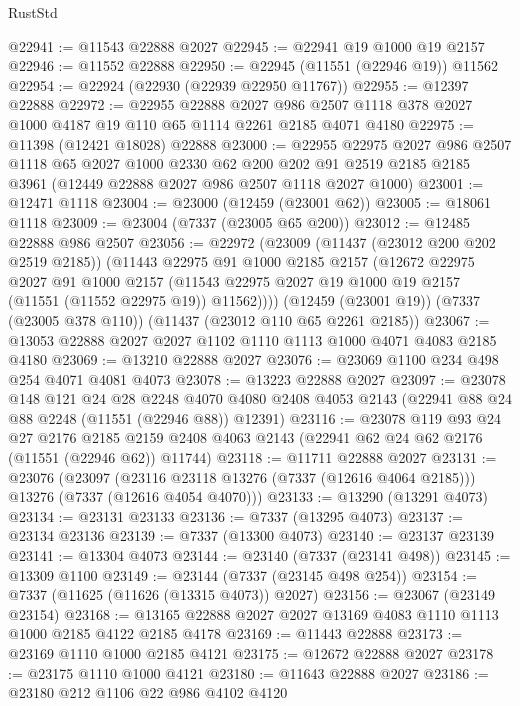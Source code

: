 \begin{lexlean}{RustStd}
\begin{coremodule}
@22941 := @11543 @22888 @2027
@22945 := @22941 @19 @1000 @19 @2157
@22946 := @11552 @22888
@22950 := @22945 (@11551 (@22946 @19)) @11562
@22954 := @22924 (@22930 (@22939 @22950 @11767))
@22955 := @12397 @22888
@22972 := @22955
    @22888
    @2027
    @986
    @2507
    @1118
    @378
    @2027
    @1000
    @4187
    @19
    @110
    @65
    @1114
    @2261
    @2185
    @4071
    @4180
@22975 := @11398 (@12421 @18028) @22888
@23000 := @22955
    @22975
    @2027
    @986
    @2507
    @1118
    @65
    @2027
    @1000
    @2330
    @62
    @200
    @202
    @91
    @2519
    @2185
    @2185
    @3961
    (@12449 @22888 @2027 @986 @2507 @1118 @2027 @1000)
@23001 := @12471 @1118
@23004 := @23000 (@12459 (@23001 @62))
@23005 := @18061 @1118
@23009 := @23004 (@7337 (@23005 @65 @200))
@23012 := @12485 @22888 @986 @2507
@23056 := @22972
    (@23009
      (@11437 (@23012 @200 @202 @2519 @2185))
      (@11443
        @22975
        @91
        @1000
        @2185
        @2157
        (@12672
          @22975
          @2027
          @91
          @1000
          @2157
          (@11543 @22975 @2027 @19 @1000 @19 @2157 (@11551 (@11552 @22975 @19)) @11562))))
    (@12459 (@23001 @19))
    (@7337 (@23005 @378 @110))
    (@11437 (@23012 @110 @65 @2261 @2185))
@23067 := @13053 @22888 @2027 @2027 @1102 @1110 @1113 @1000 @4071 @4083 @2185 @4180
@23069 := @13210 @22888 @2027
@23076 := @23069 @1100 @234 @498 @254 @4071 @4081 @4073
@23078 := @13223 @22888 @2027
@23097 := @23078
    @148
    @121
    @24
    @28
    @2248
    @4070
    @4080
    @2408
    @4053
    @2143
    (@22941 @88 @24 @88 @2248 (@11551 (@22946 @88)) @12391)
@23116 := @23078
    @119
    @93
    @24
    @27
    @2176
    @2185
    @2159
    @2408
    @4063
    @2143
    (@22941 @62 @24 @62 @2176 (@11551 (@22946 @62)) @11744)
@23118 := @11711 @22888 @2027
@23131 := @23076
    (@23097 (@23116 @23118 @13276 (@7337 (@12616 @4064 @2185))) @13276 (@7337 (@12616 @4054 @4070)))
@23133 := @13290 (@13291 @4073)
@23134 := @23131 @23133
@23136 := @7337 (@13295 @4073)
@23137 := @23134 @23136
@23139 := @7337 (@13300 @4073)
@23140 := @23137 @23139
@23141 := @13304 @4073
@23144 := @23140 (@7337 (@23141 @498))
@23145 := @13309 @1100
@23149 := @23144 (@7337 (@23145 @498 @254))
@23154 := @7337 (@11625 (@11626 (@13315 @4073)) @2027)
@23156 := @23067 (@23149 @23154)
@23168 := @13165 @22888 @2027 @2027 @13169 @4083 @1110 @1113 @1000 @2185 @4122 @2185 @4178
@23169 := @11443 @22888
@23173 := @23169 @1110 @1000 @2185 @4121
@23175 := @12672 @22888 @2027
@23178 := @23175 @1110 @1000 @4121
@23180 := @11643 @22888 @2027
@23186 := @23180 @212 @1106 @22 @986 @4102 @4120

\end{coremodule}
\end{lexlean}
